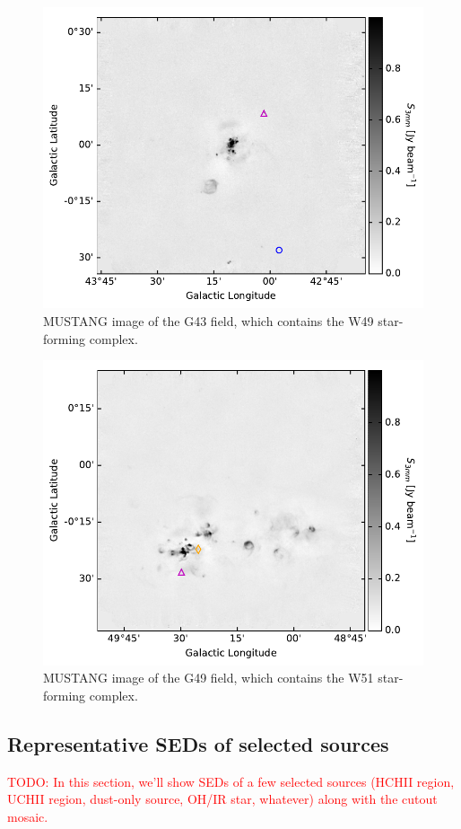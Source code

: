 \documentclass[twocolumn]{aastex62}
\def\todo#1{{\textcolor{red}{TODO: #1}}}
\begin{document}
\begin{figure}[htp]
\includegraphics[width=17cm]{figures/G43_overview_withcatalog.pdf}
\caption{MUSTANG image of the G43 field, which contains the 
W49 star-forming complex.}
\label{fig:g43overview}
\end{figure}

\begin{figure}[htp]
\includegraphics[width=17cm]{figures/G49_overview_withcatalog.pdf}
\caption{MUSTANG image of the G49 field, which contains the W51 star-forming
complex.}
\label{fig:g49overview}
\end{figure}

\subsection{Representative SEDs of selected sources}
\todo{In this section, we'll show SEDs of a few selected sources (HCHII region, UCHII region,
dust-only source, OH/IR star, whatever) along with the cutout mosaic.}


\end{document}
